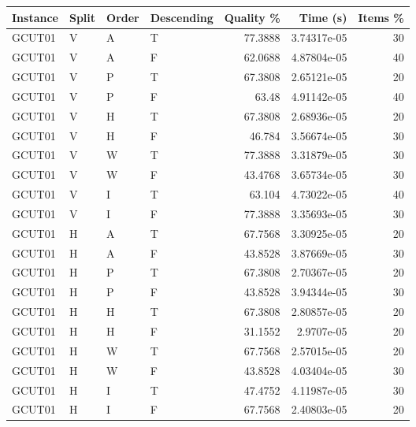 \begin{tabular}{llllrrr}
    \hline
    Instance & Split & Order & Descending & Quality \% & Time (s)    & Items \% \\
    \hline
    GCUT01   & V     & A     & T          & 77.3888    & 3.74317e-05 & 30       \\
    GCUT01   & V     & A     & F          & 62.0688    & 4.87804e-05 & 40       \\
    GCUT01   & V     & P     & T          & 67.3808    & 2.65121e-05 & 20       \\
    GCUT01   & V     & P     & F          & 63.48      & 4.91142e-05 & 40       \\
    GCUT01   & V     & H     & T          & 67.3808    & 2.68936e-05 & 20       \\
    GCUT01   & V     & H     & F          & 46.784     & 3.56674e-05 & 30       \\
    GCUT01   & V     & W     & T          & 77.3888    & 3.31879e-05 & 30       \\
    GCUT01   & V     & W     & F          & 43.4768    & 3.65734e-05 & 30       \\
    GCUT01   & V     & I     & T          & 63.104     & 4.73022e-05 & 40       \\
    GCUT01   & V     & I     & F          & 77.3888    & 3.35693e-05 & 30       \\
    GCUT01   & H     & A     & T          & 67.7568    & 3.30925e-05 & 20       \\
    GCUT01   & H     & A     & F          & 43.8528    & 3.87669e-05 & 30       \\
    GCUT01   & H     & P     & T          & 67.3808    & 2.70367e-05 & 20       \\
    GCUT01   & H     & P     & F          & 43.8528    & 3.94344e-05 & 30       \\
    GCUT01   & H     & H     & T          & 67.3808    & 2.80857e-05 & 20       \\
    GCUT01   & H     & H     & F          & 31.1552    & 2.9707e-05  & 20       \\
    GCUT01   & H     & W     & T          & 67.7568    & 2.57015e-05 & 20       \\
    GCUT01   & H     & W     & F          & 43.8528    & 4.03404e-05 & 30       \\
    GCUT01   & H     & I     & T          & 47.4752    & 4.11987e-05 & 30       \\
    GCUT01   & H     & I     & F          & 67.7568    & 2.40803e-05 & 20       \\

\end{tabular}
